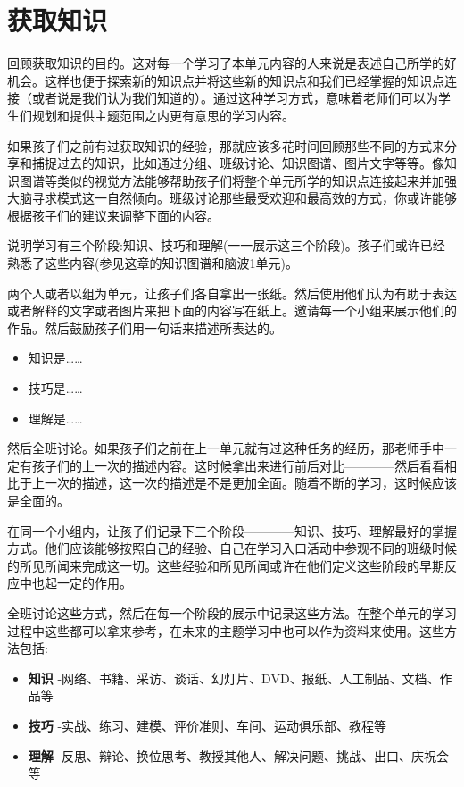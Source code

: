 \chapter{获取知识}
     回顾获取知识的目的。这对每一个学习了本单元内容的人来说是表述自己所学的好机会。这样也便于探索新的知识点并将这些新的知识点和我们已经掌握的知识点连接（或者说是我们认为我们知道的）。通过这种学习方式，意味着老师们可以为学生们规划和提供主题范围之内更有意思的学习内容。 \par
     如果孩子们之前有过获取知识的经验，那就应该多花时间回顾那些不同的方式来分享和捕捉过去的知识，比如通过分组、班级讨论、知识图谱、图片文字等等。像知识图谱等类似的视觉方法能够帮助孩子们将整个单元所学的知识点连接起来并加强大脑寻求模式这一自然倾向。班级讨论那些最受欢迎和最高效的方式，你或许能够根据孩子们的建议来调整下面的内容。\par
     说明学习有三个阶段:知识、技巧和理解(一一展示这三个阶段)。孩子们或许已经熟悉了这些内容(参见这章的知识图谱和脑波1单元)。\par
     两个人或者以组为单元，让孩子们各自拿出一张纸。然后使用他们认为有助于表达或者解释的文字或者图片来把下面的内容写在纸上。邀请每一个小组来展示他们的作品。然后鼓励孩子们用一句话来描述所表达的。
     \begin{itemize}
       \item 知识是……
       \item 技巧是……
       \item 理解是…… 
     \end{itemize}  
      然后全班讨论。如果孩子们之前在上一单元就有过这种任务的经历，那老师手中一定有孩子们的上一次的描述内容。这时候拿出来进行前后对比————然后看看相比于上一次的描述，这一次的描述是不是更加全面。随着不断的学习，这时候应该是全面的。\par
      在同一个小组内，让孩子们记录下三个阶段————知识、技巧、理解最好的掌握方式。他们应该能够按照自己的经验、自己在学习入口活动中参观不同的班级时候的所见所闻来完成这一切。这些经验和所见所闻或许在他们定义这些阶段的早期反应中也起一定的作用。\par
      全班讨论这些方式，然后在每一个阶段的展示中记录这些方法。在整个单元的学习过程中这些都可以拿来参考，在未来的主题学习中也可以作为资料来使用。这些方法包括: \par
      \begin{itemize}
      \item \textbf{知识} -网络、书籍、采访、谈话、幻灯片、DVD、报纸、人工制品、文档、作品等
      \item \textbf{技巧} -实战、练习、建模、评价准则、车间、运动俱乐部、教程等
      \item \textbf{理解} -反思、辩论、换位思考、教授其他人、解决问题、挑战、出口、庆祝会等
      \end{itemize}  

